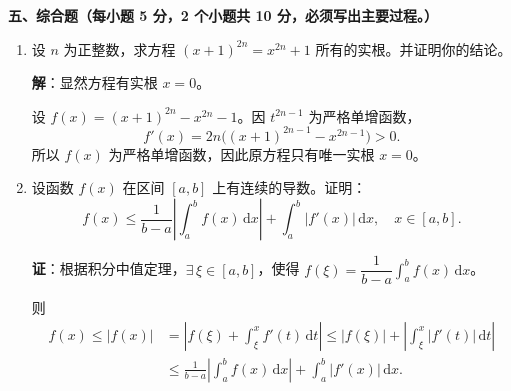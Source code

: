 \documentclass[a4paper,11pt]{ctexart}
\newcommand{\dd}{\,\mathrm{d}}
\begin{document}
\vspace{0.8em}

\newpage

\textbf{五、综合题（每小题 5 分，2 个小题共 10 分，必须写出主要过程。）}

\begin{enumerate}[label=\arabic*., start=19, leftmargin=2em, itemsep=0.9em, topsep=0.5em]
  \item 设 $n$ 为正整数，求方程 $(x+1)^{2n}=x^{2n}+1$ 所有的实根。并证明你的结论。

  \textbf{解}：显然方程有实根 $x=0$。

  设 $f(x)=(x+1)^{2n}-x^{2n}-1$。因 $t^{2n-1}$ 为严格单增函数，
  \[
    f'(x)=2n\bigl((x+1)^{2n-1}-x^{2n-1}\bigr)>0.
  \]
  所以 $f(x)$ 为严格单增函数，因此原方程只有唯一实根 $x=0$。

  \item 设函数 $f(x)$ 在区间 $[a,b]$ 上有连续的导数。证明：
  \[
    f(x)\le\frac{1}{b-a}\left|\int_a^b f(x)\dd x\right|+\int_a^b |f'(x)|\dd x,\quad x\in[a,b].
  \]

  \textbf{证}：根据积分中值定理，$\exists\,\xi\in[a,b]$，使得 $f(\xi)=\dfrac{1}{b-a}\displaystyle\int_a^b f(x)\dd x$。

  则
  \begin{align*}
    f(x) \le |f(x)| &= \left|f(\xi)+\int_\xi^x f'(t)\dd t\right| \le |f(\xi)|+\left|\int_\xi^x |f'(t)|\dd t\right| \\
    &\le \frac{1}{b-a}\left|\int_a^b f(x)\dd x\right|+\int_a^b |f'(x)|\dd x.
  \end{align*}
\end{enumerate}
\end{document}
